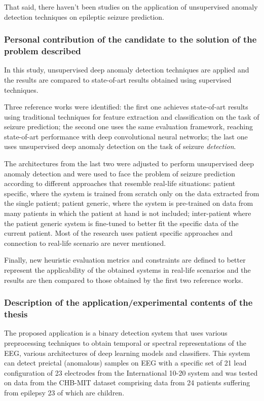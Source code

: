 That said, there haven't been studies on the application of unsupervised anomaly detection techniques on epileptic seizure prediction.



\subsubsection{Personal contribution of the candidate to the solution of the problem described}
In this study, unsupervised deep anomaly detection techniques are applied and the results are compared to state-of-art results obtained using supervised techniques.

Three reference works were identified: the first one achieves state-of-art results using traditional techniques for feature extraction and classification on the task of seizure prediction; the second one uses the same evaluation framework, reaching state-of-art performance with deep convolutional neural networks; the last one uses unsupervised deep anomaly detection on the task of seizure \textit{detection}.

The architectures from the last two were adjusted to perform unsupervised deep anomaly detection and were used to face the problem of seizure prediction according to different approaches that resemble real-life situations: patient specific, where the system is trained from scratch only on the data extracted from the single patient; patient generic, where the system is pre-trained on data from many patients in which the patient at hand is not included; inter-patient where the patient generic system is fine-tuned to better fit the specific data of the current patient. Most of the research uses patient specific approaches and connection to real-life scenario are never mentioned.

Finally, new heuristic evaluation metrics and constraints are defined to better represent the applicability of the obtained systems in real-life scenarios and the results are then compared to those obtained by the first two reference works.


\subsubsection{Description of the application/experimental contents of the thesis}
The proposed application is a binary detection system that uses various preprocessing techniques to obtain temporal or spectral representations of the EEG, various architectures of deep learning models and classifiers. This system can detect preictal (anomalous) samples on EEG with a specific set of 21 lead configuration of 23 electrodes from the International 10-20 system and was tested on data from the CHB-MIT dataset comprising data from 24 patients suffering from epilepsy 23 of which are children.

